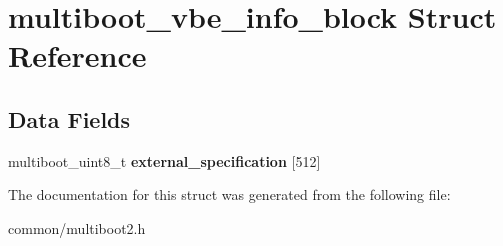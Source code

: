 \hypertarget{structmultiboot__vbe__info__block}{}\section{multiboot\+\_\+vbe\+\_\+info\+\_\+block Struct Reference}
\label{structmultiboot__vbe__info__block}
\subsection*{Data Fields}
\begin{DoxyCompactItemize}
\item 
multiboot\+\_\+uint8\+\_\+t {\bfseries external\+\_\+specification} \mbox{[}512\mbox{]}\hypertarget{structmultiboot__vbe__info__block_a0c01936f867fa598194eca54a03cf7c8}{}\label{structmultiboot__vbe__info__block_a0c01936f867fa598194eca54a03cf7c8}

\end{DoxyCompactItemize}


The documentation for this struct was generated from the following file\+:\begin{DoxyCompactItemize}
\item 
common/multiboot2.\+h\end{DoxyCompactItemize}
